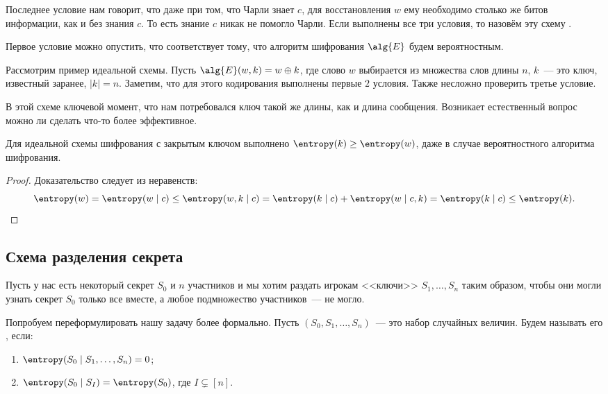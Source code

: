 Последнее условие нам говорит, что даже при том, что Чарли знает $c$, для восстановления $w$ ему
необходимо столько же битов информации, как и без знания $c$. То есть знание $c$ никак не помогло Чарли.
Если выполнены все три условия, то назовём эту схему .

\begin{remark}
    Первое условие можно опустить, что соответствует тому, что алгоритм шифрования $\alg{E}$ будем
    вероятностным.
\end{remark}

Рассмотрим пример идеальной схемы. Пусть $\alg{E}(w, k) = w \oplus k$, где слово $w$ выбирается из
множества слов длины $n$, $k$~--- это ключ, известный заранее, $|k| = n$. Заметим, что для этого
кодирования выполнены первые $2$ условия. Также несложно проверить третье условие.

В этой схеме ключевой момент, что нам потребовался ключ такой же длины, как и длина сообщения. Возникает
естественный вопрос можно ли сделать что-то более эффективное.

\begin{theorem}[Шеннон]
    Для идеальной схемы шифрования с закрытым ключом выполнено $\entropy(k) \ge \entropy(w)$, даже в
    случае вероятностного алгоритма шифрования.
\end{theorem}

\begin{proof}
    Доказательство следует из неравенств:
    $$
        \entropy(w) = \entropy(w \mid c) \le \entropy(w, k \mid c) = \entropy(k \mid c) +
        \entropy(w \mid c, k) = \entropy(k \mid c) \le \entropy(k).
    $$
\end{proof}

\subsection{Схема разделения секрета}

Пусть у нас есть некоторый секрет $S_0$ и $n$ участников и мы хотим раздать игрокам <<ключи>> $S_1,
\dots, S_n$ таким образом, чтобы они могли узнать секрет $S_0$ только все вместе, а любое подмножество
участников~--- не могло.

Попробуем переформулировать нашу задачу более формально. Пусть $(S_0, S_1, \dots, S_n)$~--- это набор
случайных величин. Будем называть его , если: 
\begin{enumerate}
    \item $\entropy(S_0 \mid S_1, \dots, S_n) = 0$;
    \item $\entropy(S_0 \mid S_I) = \entropy(S_0)$, где $I \subsetneq [n]$.
\end{enumerate}

